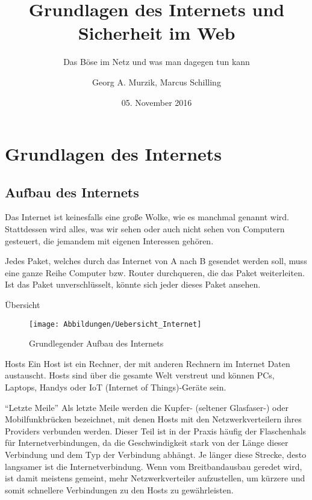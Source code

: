 \documentclass[utf8]{beamer}
\title{Grundlagen des Internets und Sicherheit im Web}
\subtitle{Das Böse im Netz und was man dagegen tun kann} %
\author{Georg A. Murzik, Marcus Schilling}
\institute{Terminal.21}
\date{05. November 2016}
\begin{document}
	
	\begin{frame}
		\titlepage
	\end{frame}
	
	\section{Grundlagen des Internets}
	\subsection{Aufbau des Internets}
	\begin{frame}
		Das Internet ist keinesfalls eine große Wolke, wie es manchmal genannt wird. Stattdessen wird alles, was wir sehen oder auch nicht sehen von Computern gesteuert, die jemandem mit eigenen Interessen gehören.
		
		Jedes Paket, welches durch das Internet von A nach B gesendet werden soll, muss eine ganze Reihe Computer bzw. Router durchqueren, die das Paket weiterleiten. Ist das Paket unverschlüsselt, könnte sich jeder dieses Paket ansehen.
	\end{frame}
	
	\begin{frame}{Übersicht}
		\begin{figure}[H]
			\texttt{[image: Abbildungen/Uebersicht\_Internet]}
			\label{fig:Übersicht des Internets}
			\caption{Grundlegender Aufbau des Internets}
		\end{figure}
	\end{frame}
	
	\begin{frame}{Hosts}
		Ein Host ist ein Rechner, der mit anderen Rechnern im Internet Daten austauscht. Hosts sind über die gesamte Welt verstreut und können PCs, Laptops, Handys oder IoT (Internet of Things)-Geräte sein.
	\end{frame}
	
	\begin{frame}{\enquote{Letzte Meile}}
		Als letzte Meile werden die Kupfer- (seltener Glasfaser-) oder Mobilfunkbrücken bezeichnet, mit denen Hosts mit den Netzwerkverteilern ihres Providers verbunden werden. Dieser Teil ist in der Praxis häufig der Flaschenhals für Internetverbindungen, da die Geschwindigkeit stark von der Länge dieser Verbindung und dem Typ der Verbindung abhängt. Je länger diese Strecke, desto langsamer ist die Internetverbindung.
		Wenn vom Breitbandausbau geredet wird, ist damit meistens gemeint, mehr Netzwerkverteiler aufzustellen, um kürzere und somit schnellere Verbindungen zu den Hosts zu gewährleisten.		
	\end{frame}
\end{document}

